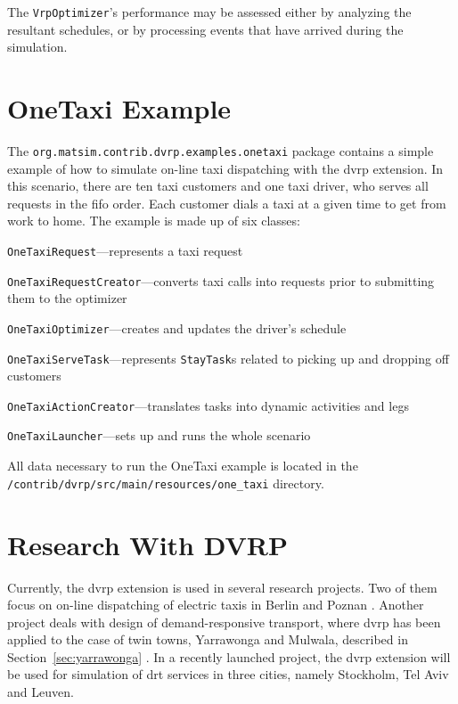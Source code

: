 The \lstinline$VrpOptimizer$'s performance may be assessed either by analyzing the resultant schedules, or by processing events that have arrived during the simulation.

\section{OneTaxi Example}
The \lstinline$org.matsim.contrib.dvrp.examples.onetaxi$ package contains a simple example of how to simulate on-line taxi dispatching with the \gls{dvrp} extension. In this scenario, there are ten taxi customers and one taxi driver, who serves all requests in the \gls{fifo} order. Each customer dials a taxi at a given time to get from work to home. The example is made up of six classes:
%
\begin{compactitem}
	\item \lstinline$OneTaxiRequest$---represents a taxi request
	
	\item \lstinline$OneTaxiRequestCreator$---converts taxi calls into requests prior to submitting them to the optimizer
	
	\item \lstinline$OneTaxiOptimizer$---creates and updates the driver's schedule
	
	\item \lstinline$OneTaxiServeTask$---represents \lstinline$StayTask$s related to picking up and dropping off customers
	
	\item \lstinline$OneTaxiActionCreator$---translates tasks into dynamic activities and legs
	
	\item \lstinline$OneTaxiLauncher$---sets up and runs the whole scenario
\end{compactitem}
%
All data necessary to run the OneTaxi example is located in the \lstinline$/contrib/dvrp/src/main/resources/one_taxi$ directory.

\section{Research With DVRP}
Currently, the \gls{dvrp} extension is used in several research projects. Two of them focus on on-line dispatching of electric taxis in Berlin and Poznan \citep{MaciejewskiNagel2013TaxiSimulation, MaciejewskiNagel2013OnlineTaxisVSPWP, MaciejewskiNagel2013CooperationTaxiDispatching, Maciejewski2014OnlineViaOffline}. Another project deals with design of demand-responsive transport, where \gls{dvrp} has been applied to the case of twin towns, Yarrawonga and Mulwala, described in Section~\ref{sec:yarrawonga} \citep{RonThoWin2015, ronald14SimulatingDRT}. In a recently launched project, the \gls{dvrp} extension will be used for simulation of \gls{drt} services in three cities, namely Stockholm, Tel Aviv and Leuven.

